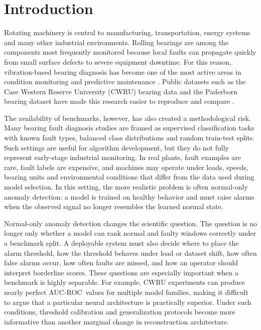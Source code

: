 \documentclass[pdflatex,sn-mathphys-num]{sn-jnl}
\newcommand{\rocauc}{AUC-ROC}
\begin{document}
\maketitle

\section{Introduction}

Rotating machinery is central to manufacturing, transportation, energy systems and many other industrial environments. Rolling bearings are among the components most frequently monitored because local faults can propagate quickly from small surface defects to severe equipment downtime. For this reason, vibration-based bearing diagnosis has become one of the most active areas in condition monitoring and predictive maintenance \citep{randall2011tutorial,smith2015cwru}. Public datasets such as the Case Western Reserve University (CWRU) bearing data and the Paderborn bearing dataset have made this research easier to reproduce and compare \citep{cwru_dataset,lessmeier2016paderborn,paderborn_datacenter}.

The availability of benchmarks, however, has also created a methodological risk. Many bearing fault diagnosis studies are framed as supervised classification tasks with known fault types, balanced class distributions and random train-test splits. Such settings are useful for algorithm development, but they do not fully represent early-stage industrial monitoring. In real plants, fault examples are rare, fault labels are expensive, and machines may operate under loads, speeds, bearing units and environmental conditions that differ from the data used during model selection. In this setting, the more realistic problem is often normal-only anomaly detection: a model is trained on healthy behavior and must raise alarms when the observed signal no longer resembles the learned normal state.

Normal-only anomaly detection changes the scientific question. The question is no longer only whether a model can rank normal and faulty windows correctly under a benchmark split. A deployable system must also decide where to place the alarm threshold, how the threshold behaves under load or dataset shift, how often false alarms occur, how often faults are missed, and how an operator should interpret borderline scores. These questions are especially important when a benchmark is highly separable. For example, CWRU experiments can produce nearly perfect \rocauc\ values for multiple model families, making it difficult to argue that a particular neural architecture is practically superior. Under such conditions, threshold calibration and generalization protocols become more informative than another marginal change in reconstruction architecture.
\end{document}
